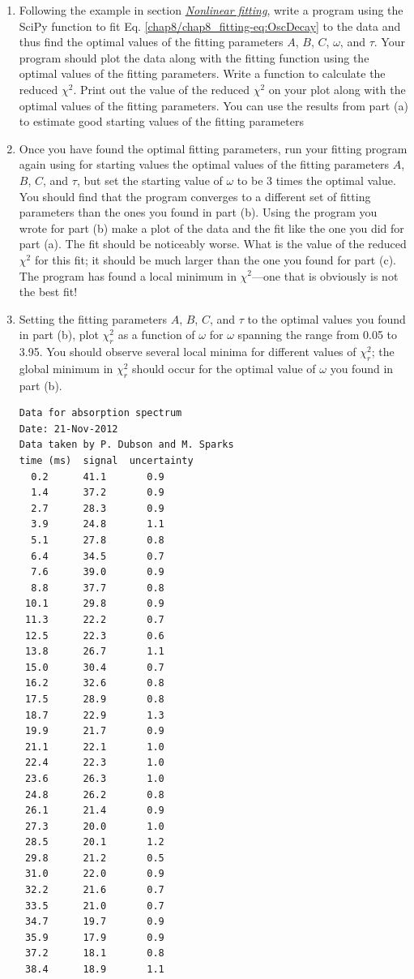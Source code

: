 \documentclass[letterpaper,10pt,english]{sphinxmanual}
\begin{document}
\begin{enumerate}
\begin{enumerate}
\item {} 
Following the example in section {\hyperref[chap8/chap8_fitting:sec-nonlinfit]{\emph{Nonlinear fitting}}}, write a program using the SciPy function  to fit Eq. \eqref{chap8/chap8_fitting-eq:OscDecay} to the data and thus find the optimal values of the fitting parameters $A$, $B$, $C$, $\omega$, and $\tau$.  Your program should plot the data along with the fitting function using the optimal values of the fitting parameters.  Write a function to calculate the reduced $\chi^2$.  Print out the value of the reduced $\chi^2$ on your plot along with the optimal values of the fitting parameters.  You can use the results from part (a) to estimate good starting values of the fitting parameters

\item {} 
Once you have found the optimal fitting parameters, run your fitting program again using for starting values the optimal values of the fitting parameters $A$, $B$, $C$, and $\tau$, but set the starting value of $\omega$ to be 3 times the optimal value.  You should find that the program converges to a different set of fitting parameters than the ones you found in part (b).  Using the program you wrote for part (b) make a plot of the data and the fit like the one you did for part (a).  The fit should be noticeably worse.  What is the value of the reduced $\chi^2$ for this fit; it should be much larger than the one you found for part (c).  The program  has found a local minimum in $\chi^2$---one that is obviously is not the best fit!

\item {} 
Setting the fitting parameters $A$, $B$, $C$, and $\tau$ to the optimal values you found in part (b), plot $\chi_r^2$ as a function of $\omega$ for $\omega$ spanning the range from 0.05 to 3.95.  You should observe several local minima for different values of $\chi_r^2$; the global minimum in $\chi_r^2$ should occur for the optimal value of $\omega$ you found in part (b).

\begin{Verbatim}[commandchars=\\\{\}]
Data for absorption spectrum
Date: 21-Nov-2012
Data taken by P. Dubson and M. Sparks
time (ms)  signal  uncertainty
  0.2      41.1       0.9
  1.4      37.2       0.9
  2.7      28.3       0.9
  3.9      24.8       1.1
  5.1      27.8       0.8
  6.4      34.5       0.7
  7.6      39.0       0.9
  8.8      37.7       0.8
 10.1      29.8       0.9
 11.3      22.2       0.7
 12.5      22.3       0.6
 13.8      26.7       1.1
 15.0      30.4       0.7
 16.2      32.6       0.8
 17.5      28.9       0.8
 18.7      22.9       1.3
 19.9      21.7       0.9
 21.1      22.1       1.0
 22.4      22.3       1.0
 23.6      26.3       1.0
 24.8      26.2       0.8
 26.1      21.4       0.9
 27.3      20.0       1.0
 28.5      20.1       1.2
 29.8      21.2       0.5
 31.0      22.0       0.9
 32.2      21.6       0.7
 33.5      21.0       0.7
 34.7      19.7       0.9
 35.9      17.9       0.9
 37.2      18.1       0.8
 38.4      18.9       1.1
\end{Verbatim}


\end{enumerate}
\end{enumerate}
\end{document}
